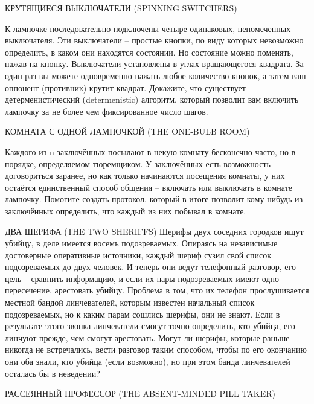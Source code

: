 КРУТЯЩИЕСЯ ВЫКЛЮЧАТЕЛИ (SPINNING SWITCHERS)

К лампочке последовательно подключены четыре одинаковых, непомеченных выключателя. Эти выключатели -- простые кнопки, по виду которых невозможно определить, в каком они находятся состоянии. Но состояние можно поменять, нажав на кнопку. Выключатели установлены в углах вращающегося квадрата. За один раз вы можете одновременно нажать любое количество кнопок, а затем ваш оппонент (противник) крутит квадрат. Докажите, что существует детерменистический (determenistic) алгоритм, который позволит вам включить лампочку за не более чем фиксированное число шагов.


КОМНАТА С ОДНОЙ ЛАМПОЧКОЙ (THE ONE-BULB ROOM)

Каждого из n заключённых посылают в некую комнату бесконечно часто, но в порядке, определяемом тюремщиком. У заключённых есть возможность договориться заранее, но как только начинаются посещения комнаты, у них остаётся единственный способ общения -- включать или выключать в комнате лампочку. Помогите создать протокол, который в итоге позволит кому-нибудь из заключённых определить, что каждый из них побывал в комнате.

ДВА ШЕРИФА (ТHE TWO SHERIFFS)
Шерифы двух соседних городков ищут убийцу, в деле имеется восемь подозреваемых. Опираясь на независимые достоверные оперативные источники, каждый шериф сузил свой список подозреваемых до двух человек. И теперь они ведут телефонный разговор, его цель -- сравнить информацию, и если их пары подозреваемых имеют одно пересечение, арестовать убийцу.
Проблема в том, что их телефон прослушивается местной бандой линчевателей, которым известен начальный список подозреваемых, но к каким парам сошлись шерифы, они не знают. Если в результате этого звонка линчеватели смогут точно определить, кто убийца, его линчуют прежде, чем смогут арестовать.
Могут ли шерифы, которые раньше никогда не встречались, вести разговор таким способом, чтобы по его окончанию они оба знали, кто убийца (если возможно), но при этом банда линчевателей осталась бы в неведении?

РАССЕЯННЫЙ ПРОФЕССОР (THE ABSENT-MINDED PILL TAKER)

